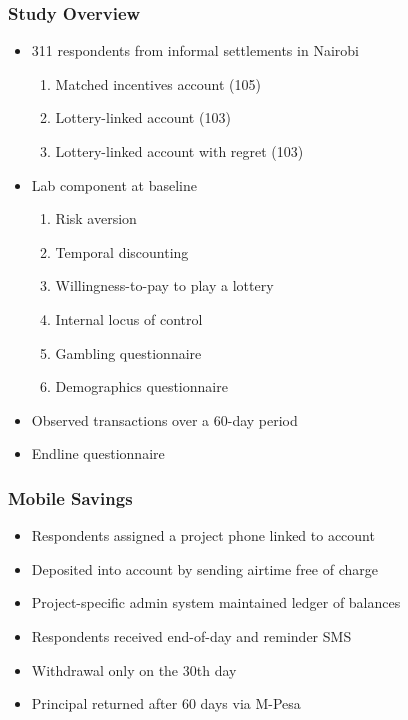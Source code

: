 \documentclass{beamer}
\begin{document}
\begin{frame} \frametitle{Study Overview} \pause

	\begin{itemize}
	\item 311 respondents from informal settlements in Nairobi \pause
		\begin{enumerate}
		\item Matched incentives account (105) \pause
		\item Lottery-linked account (103) \pause
		\item Lottery-linked account with regret (103) \pause
		\end{enumerate}
	\item Lab component at baseline \pause
		\begin{enumerate}
		\item Risk aversion  \pause
		\item Temporal discounting \pause
		\item Willingness-to-pay to play a lottery \pause
		\item Internal locus of control \pause
		\item Gambling questionnaire \pause
		\item Demographics questionnaire \pause
		\end{enumerate}
	\item Observed transactions over a 60-day period \pause
	\item Endline questionnaire \pause
	\end{itemize}

\end{frame}


\begin{frame} \frametitle{Mobile Savings} \pause
	
	\begin{itemize}

	\item Respondents assigned a project phone linked to account \pause
	\item Deposited into account by sending airtime free of charge \pause
	\item Project-specific admin system maintained ledger of balances \pause
	\item Respondents received end-of-day and reminder SMS \pause
	\item Withdrawal only on the 30th day \pause
	\item Principal returned after 60 days via M-Pesa \pause
	\end{itemize}

\end{frame}
\end{document}
